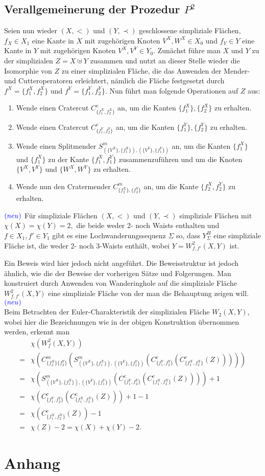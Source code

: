 \documentclass[12pt,titlepage]{article}
\begin{document}
  \subsection{Verallgemeinerung der Prozedur $P^2$}
Seien nun wieder $(X,<)$ und $(Y,\prec)$ geschlossene simpliziale Flächen, $f_X\in X_1$ eine Kante in $X$ mit zugehörigen Knoten $V^X,W^X \in X_0$ und $f_Y\in Y$ eine Kante in $Y$ mit zugehörigen Knoten $V^X,V^Y\in Y_0$. Zunächst führe man $X$ und $Y$ zu der simplizialen $Z=X \uplus Y$ zusammen und nutzt an dieser Stelle wieder die Isomorphie von $Z$ zu einer simplizialen Fläche, die das Anwenden der Mender- und Cutteroperatoren erleichtert, nämlich die Fläche festgesetzt durch $f^X=\{f_1^X,f^X_2\}$ und $f^Y=\{f_1^Y,f^Y_2\}$. Nun führt man folgende Operationen auf $Z$ aus:
\begin{enumerate}
 \item Wende einen Cratercut $C^c_{\{f_1^X,f_2^X\}}$ an, um die Kanten $\{f_1^X\},\{f_2^X\}$ zu erhalten.
 \item Wende einen Cratercut $C^c_{\{f_1^Y,f_2^Y\}}$ an, um die Kanten $\{f_1^Y\},\{{f_2^Y}\}$ zu erhalten.
\item Wende einen Splitmender $S^m_{(\{V^X\},\{f_1^X\}),(\{V^Y\},\{f_1^Y\})}$ an, um die Kanten $\{f_1^X\}$ und $\{{f_1^X}\}$ zu der Kante $\{f_1^X,f_1^Y\}$ zusammenzuführen und um die Knoten $\{V^X,V^Y\}$ und $\{W^X,W^Y\}$ zu erhalten.
 \item Wende nun den Cratermender $C^m_{\{f_2^X\},\{{f_2^Y}\}}$ an, um die Kante $\{f_2^X,f_2^Y\}$ zu erhalten.
 \end{enumerate}
 
 \begin{folgerung} $\textcolor{blue}{(neu)}$
 Für simpliziale Flächen $(X,<)$ und $(Y,\prec)$ simpliziale Flächen mit $\chi(X)=\chi(Y)=2,$ die beide weder 2- noch Waists enthalten und $f\in X_1,f'\in Y_1$ gibt es eine Lochwanderungssequenz $\Sigma$ so, dass $Y^H_{\Sigma}$ eine simpliziale Fläche ist, die weder 2- noch 3-Waists enthält, wobei $Y=W^2_{f,f'}(X,Y)$ ist.
 \end{folgerung}
Ein Beweis wird hier jedoch nicht angeführt. Die Beweisstruktur ist jedoch ähnlich, wie die der Beweise der vorherigen Sätze und Folgerungen. Man konstruiert durch Anwenden von Wanderinghole auf die simpliziale Fläche $W^2_{f,f'}(X,Y)$ eine simpliziale Fläche von der man die Behauptung zeigen will. 
$ \textcolor{blue}{(neu)}$\\
Beim Betrachten der Euler-Charakteristik der simplizialen Fläche $W_2(X,Y)$, wobei hier die Bezeichnungen wie in der obigen Konstruktion übernommen werden, erkennt man 
\begin{align*}
&\chi(W^2_f(X,Y))\\
=&\chi(C^m_{\{f_2^X\}\{{f_2^Y}\}}(S^m_{(\{V^X\},\{f_1^X\}),(\{V^Y\},\{f_1^Y\})}(C^c_{\{f_1^Y,f_2^Y\}}(C^c_{\{f_1^X,f_2^X\}}(Z)))))\\
=&\chi(S^m_{(\{V^X\},\{f_1^X\}),(\{V^Y\},\{f_1^Y\})}(C^c_{\{f_1^Y,f_2^Y\}}(C^c_{\{f_1^X,f_2^X\}}(Z))))+1\\
=&\chi(C^c_{\{f_1^Y,f_2^Y\}}(C^c_{\{f_1^X,f_2^X\}}(Z)))+1-1\\
=&\chi(C^c_{\{f_1^X,f_2^X\}}(Z))-1\\
=&\chi(Z)-2=\chi(X)+\chi(Y)-2.
\end{align*}
\newpage
\section*{Anhang}

%
\end{document}
